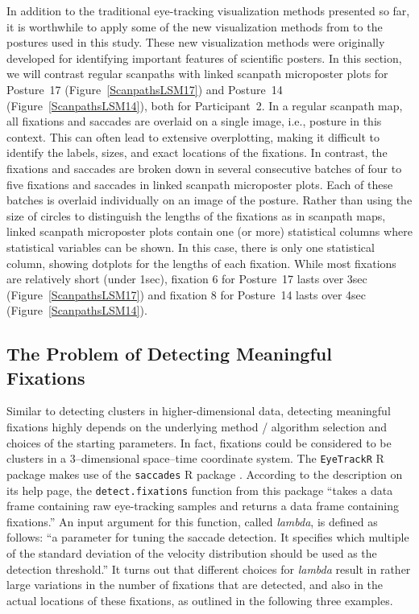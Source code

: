\documentclass[11pt]{asaproc}
\begin{document}
In addition to the traditional eye-tracking visualization methods presented so far, it is worthwhile to
apply some of the new visualization methods from \cite{LS2016ASA,LS2017ASA} to the postures used in this study.
These new visualization methods were originally developed for identifying important features of scientific posters.
In this section, we will contrast regular scanpaths with linked scanpath microposter plots
for Posture~17 (Figure~\ref{ScanpathsLSM17}) 
and Posture~14 (Figure~\ref{ScanpathsLSM14}), both for Participant~2. 
In a regular scanpath map, all fixations and saccades are overlaid on a single image, i.e., posture in this context.
This can often lead to extensive overplotting, making it difficult to identify the
labels, sizes, and exact locations of the fixations. 
In contrast, 
the fixations and saccades are broken down in several consecutive batches
of four to five fixations and saccades in linked scanpath microposter plots. 
Each of these batches is overlaid individually on an image
of the posture. Rather than using the size of circles to distinguish the lengths of the fixations as in scanpath maps,
linked scanpath microposter plots contain one (or more) statistical columns where statistical variables
can be shown. In this case, there is only one statistical column, showing dotplots for the lengths
of each fixation. While most fixations are relatively short (under 1sec), fixation 6 for Posture~17 lasts over 3sec
(Figure~\ref{ScanpathsLSM17}) and fixation 8 for Posture~14 lasts over 4sec
(Figure~\ref{ScanpathsLSM14}).



\subsection{The Problem of Detecting Meaningful Fixations}
\label{MeaningfulFixations}


Similar to detecting clusters in higher-dimensional data, detecting meaningful fixations highly depends
on the underlying method / algorithm selection and choices of the starting parameters.
In fact, fixations could be considered to be clusters in a 3--dimensional space--time coordinate system.
The {\tt EyeTrackR} R package makes use of the {\tt saccades} R package \citep{VDM2015}.
According to the description on its help page, the {\tt detect.fixations} function from this package
``takes a data frame containing raw eye-tracking samples and returns a data frame containing fixations.''
An input argument for this function, called {\it lambda}, is defined as follows:
``a parameter for tuning the saccade detection. It specifies which multiple of the standard deviation of the velocity 
distribution should be used as the detection threshold.''
It turns out that different choices for {\it lambda} result in rather large variations in the number
of fixations that are detected, and also in the actual locations of these fixations, as outlined
in the following three examples.
\end{document}
